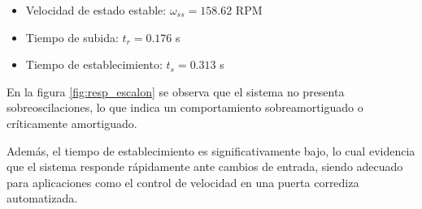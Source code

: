 \documentclass[letter,12pt]{article}
\begin{document}
\begin{itemize}
	\item Velocidad de estado estable: $\omega_{ss} = 158.62$ RPM
	\item Tiempo de subida: $t_r = 0.176$ s
	\item Tiempo de establecimiento: $t_s = 0.313$ s
\end{itemize}

En la figura \ref{fig:resp_escalon} se observa que el sistema no presenta sobreoscilaciones, lo que indica un comportamiento sobreamortiguado o críticamente amortiguado.

Además, el tiempo de establecimiento es significativamente bajo, lo cual evidencia que el sistema responde rápidamente ante cambios de entrada, siendo adecuado para aplicaciones como el control de velocidad en una puerta corrediza automatizada.



\newpage
\printbibliography
\end{document}
